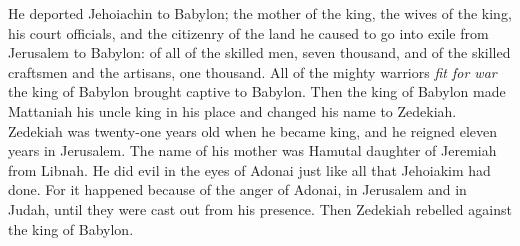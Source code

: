 \begin{biblechapter}
\verse He deported Jehoiachin to Babylon; the mother of the king, the wives of the king, his court officials, and the citizenry of the land he caused to go into exile from Jerusalem to Babylon:
\verse of all of the skilled men, seven thousand, and of the skilled craftsmen and the artisans, one thousand. All of the mighty warriors \textit{fit for war} the king of Babylon brought captive to Babylon.
\verse Then the king of Babylon made Mattaniah his uncle king in his place and changed his name to Zedekiah.
 Zedekiah was twenty-one years old when he became king, and he reigned eleven years in Jerusalem. The name of his mother was Hamutal daughter of Jeremiah from Libnah.
\verse He did evil in the eyes of Adonai just like all that Jehoiakim had done.
\verse For it happened because of the anger of Adonai, in Jerusalem and in Judah, until they were cast out from his presence. Then Zedekiah rebelled against the king of Babylon.
\end{biblechapter}

